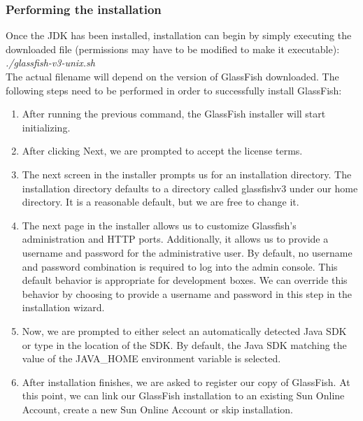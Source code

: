 \subsubsection{Performing the installation}
Once the JDK has been installed, installation can begin by simply executing the downloaded file (permissions may have to be modified to make it executable):\\
\emph{./glassfish-v3-unix.sh}\\
The actual filename will depend on the version of GlassFish downloaded. The following steps need to be performed in order to successfully install GlassFish:
\begin{enumerate}
\item After running the previous command, the GlassFish installer will start initializing.

\item After clicking Next, we are prompted to accept the license terms.

\item The next screen in the installer prompts us for an installation directory. The installation directory defaults to a directory called glassfishv3 under our home directory. It is a reasonable default, but we are free to change it.

\item The next page in the installer allows us to customize Glassfish's administration and HTTP ports. Additionally, it allows us to provide a username and password for the administrative user. By default, no username and password combination is required to log into the admin console. This
default behavior is appropriate for development boxes. We can override this behavior by choosing to provide a username and password in this step in the installation wizard.


\item Now, we are prompted to either select an automatically detected Java SDK or type in the location of the SDK. By default, the Java SDK matching the value of the JAVA\_HOME environment variable is selected.

\item After installation finishes, we are asked to register our copy of GlassFish. At this point, we can link our GlassFish installation to an existing Sun Online Account, create a new Sun Online Account or skip installation.
\end{enumerate}

